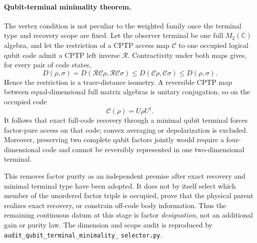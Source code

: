 \paragraph{Qubit-terminal minimality theorem.}
The vertex condition is not peculiar to the weighted family once the terminal
type and recovery scope are fixed. Let the observer terminal be one full
$M_2(\mathbb C)$ algebra, and let the restriction of a CPTP access map
$\mathcal C$ to one occupied logical qubit code admit a CPTP left inverse
$\mathcal R$. Contractivity under both maps gives, for every pair of code
states,
\begin{equation}
 D(\rho,\sigma)
 =D(\mathcal R\mathcal C\rho,\mathcal R\mathcal C\sigma)
 \leq D(\mathcal C\rho,\mathcal C\sigma)
 \leq D(\rho,\sigma).
\end{equation}
Hence the restriction is a trace-distance isometry. A reversible CPTP map
between equal-dimensional full matrix algebras is unitary conjugation, so on
the occupied code
\begin{equation}
 \mathcal C(\rho)=U\rho U^\dagger.
 \label{eq:qubitterminalunitary}
\end{equation}
It follows that exact full-code recovery through a minimal qubit terminal
forces factor-pure access on that code; convex averaging or depolarization is
excluded. Moreover, preserving two complete qubit factors jointly would
require a four-dimensional code and cannot be reversibly represented in one
two-dimensional terminal.

This removes factor purity as an independent premise after exact recovery and
minimal terminal type have been adopted. It does not by itself select which
member of the unordered factor triple is occupied, prove that the physical
parent realizes exact recovery, or constrain off-code body information. Thus
the remaining continuous datum at this stage is factor \emph{designation},
not an additional gain or purity law. The dimension and scope audit is
reproduced by
\texttt{audit\_qubit\_terminal\_minimality\_}\allowbreak
\texttt{selector.py}.

